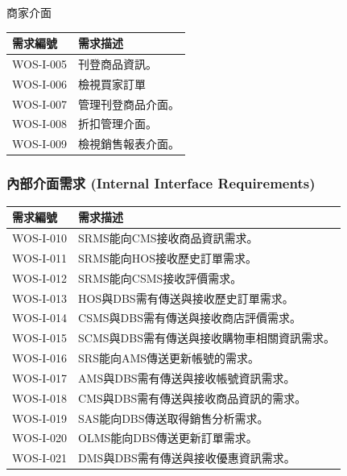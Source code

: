 \documentclass[a4paper, 12pt]{article}
\begin{document}
\setlength{\parindent}{2em} 商家介面
\begin{center}
\noindent\begin{tabular}{ | p{6.5em} | p{32em} |}
    \hline
    需求編號 & 需求描述 \\ 
    \hline
    WOS-I-005 & 刊登商品資訊。\\
    \hline
    WOS-I-006 & 檢視買家訂單\\
    \hline
    WOS-I-007 & 管理刊登商品介面。\\
    \hline
    WOS-I-008 & 折扣管理介面。\\
    \hline
    WOS-I-009 & 檢視銷售報表介面。\\
    \hline
    \end{tabular}
\end{center}
    
\subsubsection{內部介面需求 (Internal Interface Requirements)}
\begin{center}
    \begin{tabular}{ | p{6.5em} | p{32em} |}
    \hline
    需求編號 & 需求描述 \\ 
    \hline
    WOS-I-010 & SRMS能向CMS接收商品資訊需求。\\
    \hline
    WOS-I-011 & SRMS能向HOS接收歷史訂單需求。\\
    \hline
    WOS-I-012 & SRMS能向CSMS接收評價需求。\\
    \hline
    WOS-I-013 & HOS與DBS需有傳送與接收歷史訂單需求。\\
    \hline
    WOS-I-014 & CSMS與DBS需有傳送與接收商店評價需求。\\
    \hline
    WOS-I-015 & SCMS與DBS需有傳送與接收購物車相關資訊需求。\\
    \hline
    WOS-I-016 & SRS能向AMS傳送更新帳號的需求。\\
    \hline
    WOS-I-017 & AMS與DBS需有傳送與接收帳號資訊需求。\\
    \hline
    WOS-I-018 & CMS與DBS需有傳送與接收商品資訊的需求。\\
    \hline
    WOS-I-019 & SAS能向DBS傳送取得銷售分析需求。\\
    \hline
    WOS-I-020 & OLMS能向DBS傳送更新訂單需求。\\
    \hline
    WOS-I-021 & DMS與DBS需有傳送與接收優惠資訊需求。\\
    \hline
    \end{tabular}
\end{center}
\end{document}
